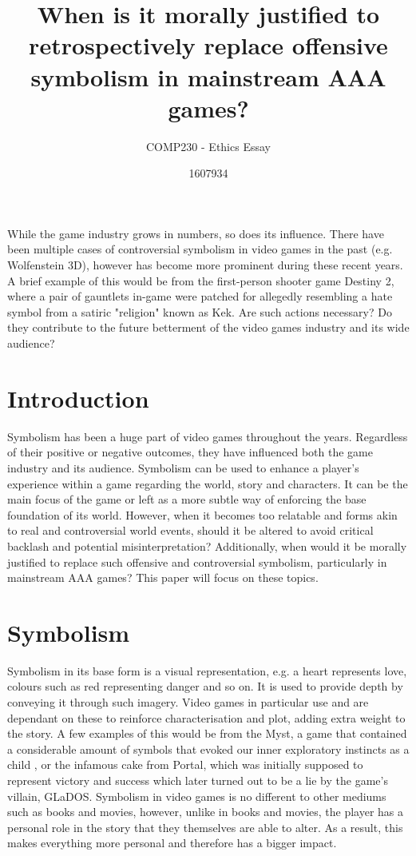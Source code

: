 \documentclass{scrartcl}
\title{When is it morally justified to retrospectively replace offensive symbolism in mainstream AAA games?}
\subtitle{COMP230 - Ethics Essay}
\author{1607934}
\begin{document}
\maketitle

\abstract{} 
While the game industry grows in numbers, so does its influence. There have been multiple cases of controversial symbolism in video games in the past (e.g. Wolfenstein 3D), however has become more prominent during these recent years. A brief example of this would be from the first-person shooter game Destiny 2, where a pair of gauntlets in-game were patched for allegedly resembling a hate symbol from a satiric "religion" known as Kek. Are such actions necessary? Do they contribute to the future betterment of the video games industry and its wide audience?

\section{Introduction}
Symbolism has been a huge part of video games throughout the years. Regardless of their positive or negative outcomes, they have influenced both the game industry and its audience. Symbolism can be used to enhance a player's experience within a game regarding the world, story and characters. It can be the main focus of the game or left as a more subtle way of enforcing the base foundation of its world. However, when it becomes too relatable and forms akin to real and controversial world events, should it be altered to avoid critical backlash and potential misinterpretation? Additionally, when would it be morally justified to replace such offensive and controversial symbolism, particularly in mainstream AAA games? This paper will focus on these topics.


\section{Symbolism}
Symbolism in its base form is a visual representation, e.g. a heart represents love, colours such as red representing danger and so on. It is used to provide depth by conveying it through such imagery. Video games in particular use and are dependant on these to reinforce characterisation and plot, adding extra weight to the story. A few examples of this would be from the Myst, a game that contained a considerable amount of symbols that evoked our inner exploratory instincts as a child \cite{xander}, or the infamous cake from Portal, which was initially supposed to represent victory and success which later turned out to be a lie by the game's villain, GLaDOS. Symbolism in video games is no different to other mediums such as books and movies, however, unlike in books and movies, the player has a personal role in the story that they themselves are able to alter. As a result, this makes everything more personal and therefore has a bigger impact. 
\end{document}
